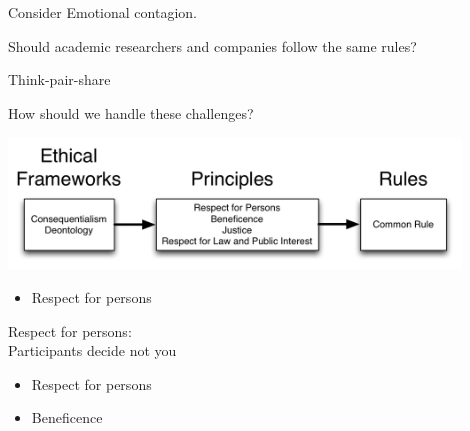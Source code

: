 \documentclass{beamer}
\begin{document}
\begin{frame}

Consider Emotional contagion.
\begin{center}
\LARGE{Should academic researchers and companies follow the same rules?}
\end{center}

Think-pair-share

\end{frame}
\begin{frame}

\begin{center}
\LARGE{How should we handle these challenges?}
\end{center}

\end{frame}
\begin{frame}

\begin{center}
\includegraphics[width=0.9\textwidth]{figures/ethics_schematic_simple.png}
\end{center}

\end{frame}
\begin{frame}

\begin{itemize}
\item Respect for persons
\end{itemize}

\end{frame}
\begin{frame}

Respect for persons:\\
Participants decide not you

\end{frame}
\begin{frame}

\begin{itemize}
\item Respect for persons
\item Beneficence
\end{itemize}

\end{frame}
\end{document}
